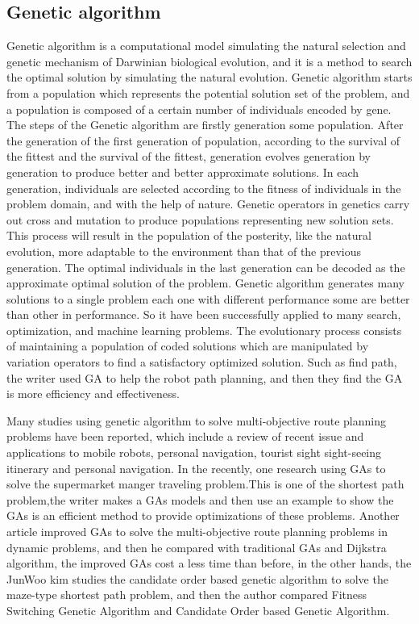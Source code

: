 \documentclass[12pt]{article}
\begin{document}
\subsection{Genetic algorithm}
Genetic algorithm is a computational model simulating the natural selection and genetic mechanism of Darwinian biological evolution, and it is a method to search the optimal solution by simulating the natural evolution. Genetic algorithm starts from a population which represents the potential solution set of the problem, and a population is composed of a certain number of individuals encoded by gene. The steps of the Genetic algorithm are firstly generation some population. After the generation of the first generation of population, according to the survival of the fittest and the survival of the fittest, generation evolves generation by generation to produce better and better approximate solutions. In each generation, individuals are selected according to the fitness of individuals in the problem domain, and with the help of nature. Genetic operators in genetics carry out cross and mutation to produce populations representing new solution sets. This process will result in the population of the posterity, like the natural evolution, more adaptable to the environment than that of the previous generation. The optimal individuals in the last generation can be decoded as the approximate optimal solution of the problem. Genetic algorithm generates many solutions to a single problem each one with different performance some are better than other in performance. So it have been successfully applied to many search, optimization, and machine learning problems. The evolutionary process consists of maintaining a population of coded solutions which are manipulated by variation operators to find a satisfactory optimized solution. Such as find path, the writer used GA to help the robot path planning\cite{Alnasser2016}, and then they find the GA is more efficiency and effectiveness. 

Many studies using genetic algorithm to solve multi-objective route planning problems have been reported, which include a review of recent issue and applications to mobile robots, personal navigation, tourist sight sight-seeing itinerary and personal navigation. In the recently, one research using GAs to solve the supermarket manger traveling problem\cite{Al-hayali2018}.This is one of the shortest path problem,the writer makes a GAs models and then use an example to show the GAs is an efficient method to provide optimizations of these problems. Another article\cite{Kanoh2008} improved GAs to solve the multi-objective route planning problems in dynamic problems, and then he compared with traditional GAs and Dijkstra algorithm, the improved GAs cost a less time than before, in the other hands, the JunWoo\cite{Kim2019} kim studies the candidate order based genetic algorithm to solve the maze-type shortest path problem, and then the author compared Fitness Switching Genetic Algorithm and Candidate Order based Genetic Algorithm. 
\end{document}

